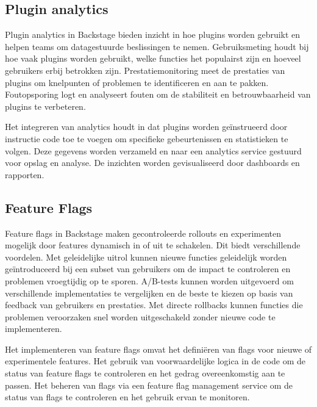 \subsection{Plugin analytics}

Plugin analytics in Backstage bieden inzicht in hoe plugins worden gebruikt en helpen teams om datagestuurde beslissingen te nemen. Gebruiksmeting houdt bij hoe vaak plugins worden gebruikt, welke functies het populairst zijn en hoeveel gebruikers erbij betrokken zijn. Prestatiemonitoring meet de prestaties van plugins om knelpunten of problemen te identificeren en aan te pakken. Foutopsporing logt en analyseert fouten om de stabiliteit en betrouwbaarheid van plugins te verbeteren.

Het integreren van analytics houdt in dat plugins worden geïnstrueerd door instructie code toe te voegen om specifieke gebeurtenissen en statistieken te volgen. Deze gegevens worden verzameld en naar een analytics service gestuurd voor opslag en analyse. De inzichten worden gevisualiseerd door dashboards en rapporten.

\subsection{Feature Flags}

Feature flags in Backstage maken gecontroleerde rollouts en experimenten mogelijk door features dynamisch in of uit te schakelen. Dit biedt verschillende voordelen. Met geleidelijke uitrol kunnen nieuwe functies geleidelijk worden geïntroduceerd bij een subset van gebruikers om de impact te controleren en problemen vroegtijdig op te sporen. A/B-tests kunnen worden uitgevoerd om verschillende implementaties te vergelijken en de beste te kiezen op basis van feedback van gebruikers en prestaties. Met directe rollbacks kunnen functies die problemen veroorzaken snel worden uitgeschakeld zonder nieuwe code te implementeren.

Het implementeren van feature flags omvat het definiëren van flags voor nieuwe of experimentele features. Het gebruik van voorwaardelijke logica in de code om de status van feature flags te controleren en het gedrag overeenkomstig aan te passen. Het beheren van flags via een feature flag management service om de status van flags te controleren en het gebruik ervan te monitoren.
